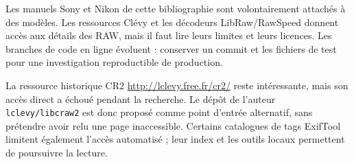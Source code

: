 Les manuels Sony et Nikon de cette bibliographie sont
volontairement attachés à des modèles. Les ressources
Clévy et les décodeurs LibRaw/RawSpeed donnent accès aux
détails des RAW, mais il faut lire leurs limites et leurs
licences. Les branches de code en ligne évoluent : conserver
un commit et les fichiers de test pour une investigation
reproductible de production.

La ressource historique CR2 \url{http://lclevy.free.fr/cr2/}
reste intéressante, mais son accès direct a échoué pendant
la recherche. Le dépôt de l'auteur \texttt{lclevy/libcraw2}
est donc proposé comme point d'entrée alternatif, sans
prétendre avoir relu une page inaccessible. Certains
catalogues de tags ExifTool limitent également l'accès
automatisé ; leur index et les outils locaux permettent
de poursuivre la lecture.

